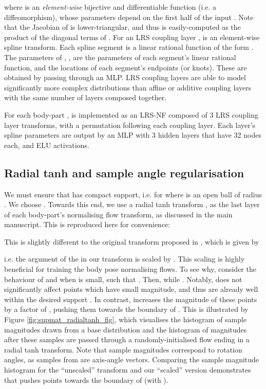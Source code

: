where  is an \textit{element-wise} bijective and differentiable function (i.e. a diffeomorphism), whose parameters  depend on the first half of the input . Note that the Jacobian of  is lower-triangular, and thus  is easily-computed as the product of the diagonal terms of . For an LRS coupling layer \cite{dolatabadi2020lrs},  is an element-wise spline transform. Each spline segment is a linear rational function of the form . The parameters of , , are the parameters of each segment's linear rational function, and the locations of each segment's endpoints (or knots). These are obtained by passing  through an MLP. LRS coupling layers are able to model significantly more complex distributions \cite{dolatabadi2020lrs} than affine \cite{dinh2017realnvp} or additive \cite{dinh2015nice} coupling layers with the same number of layers composed together.

For each body-part ,   is implemented as an LRS-NF composed of 3 LRS coupling layer transforms, with a permutation following each coupling layer. Each layer's spline parameters are output by an MLP with 3 hidden layers that have 32 nodes each, and ELU \cite{clevert2016elu} activations.

\subsection{Radial tanh and sample angle regularisation}

We must ensure that  has compact support, i.e.  for  where  is an open ball of radius . We choose . Towards this end, we use a radial tanh transform \cite{falorsi2019reparameterizing},  as the last layer of each body-part's normalising flow transform, as discussed in the main manuscript. This is reproduced here for convenience:


This is slightly different to the original transform proposed in \cite{falorsi2019reparameterizing}, which is given by

i.e. the argument of the  in our transform is scaled by . This scaling is highly beneficial for training the body pose normalising flows. To see why, consider the behaviour of  and  when  is small, such that . Then,  while . Notably,  does not significantly affect points which have small magnitude, and thus are already well within the desired support . In contrast,  increases the magnitude of these points by a factor of , pushing them towards the boundary of . This is illustrated by Figure \ref{fig:supmat_radialtanh_fig}, which visualises the histogram of sample magnitudes drawn from a base distribution  and the histogram of magnitudes after these samples are passed through a randomly-initialised flow ending in a radial tanh transform. Note that sample magnitudes correspond to rotation angles, as samples from  are axis-angle vectors. Comparing the sample magnitude histogram for the ``unscaled'' transform \cite{falorsi2019reparameterizing}  and our ``scaled'' version  demonstrates that  pushes points towards the boundary of  (with ).

